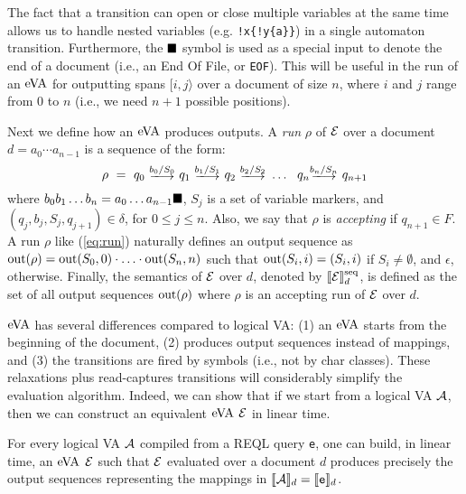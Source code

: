 The fact that a transition can open or close multiple variables at the same time
	allows us to handle nested variables (e.g. \texttt{!x\{!y\{a\}\}}) in a
	single automaton transition. Furthermore, the $\blacksquare$ symbol is used as a
	special input to denote the end of a document (i.e., an End Of File, or
	\texttt{EOF}). This will be useful in the run of an $\mathrm{eVA}$ for outputting
	spans $[i, j\rangle$ over a document of size $n$, where $i$ and $j$ range
	from $0$ to $n$ (i.e., we need $n+1$ possible positions).

Next we define how an $\mathrm{eVA}$ produces outputs. A \emph{run} $\rho$ of $\mathcal{E}$ over
a document $d = a_0 \cdots a_{n-1}$ is a sequence of the form:
\begin{equation}\label{eq:run}
	\rho \ = \ q_0 \ \longtrans{b_0 / S_0} \ q_1 \ \longtrans{b_1 / S_1} \ q_2 \ \longtrans{b_2 / S_2} \ \ldots \ \ q_{n} \longtrans{b_{n} / S_n} \ q_{n+1}
\end{equation}
where $b_0 b_1 \ldots b_n = a_0 \ldots a_{n-1} \blacksquare$, $S_j$ is a set of
variable markers, and $(q_j,b_{j},S_{j}, q_{j+1}) \in \delta$, for $0\leq j\leq
n$. Also, we say that $\rho$ is \emph{accepting} if $q_{n+1} \in F$. A run
$\rho$ like (\ref{eq:run}) naturally defines an output sequence as $\operatorname{out}(\rho)
= \operatorname{out}(S_0, 0) \cdot \ldots \cdot \operatorname{out}(S_n, n)$ such that $\operatorname{out}(S_i, i) =
(S_i, i)$ if $S_i \neq \emptyset$, and $\epsilon$, otherwise. Finally, the
semantics of $\mathcal{E}$ over $d$, denoted by $\llbracket\mathcal{E}\rrbracket^{\operatorname{seq}}_d$, is defined as the set
of all output sequences $\operatorname{out}(\rho)$ where $\rho$ is an accepting run of $\mathcal{E}$
over $d$.

$\mathrm{eVA}$ has several differences compared to logical VA: (1) an $\mathrm{eVA}$ starts from
the beginning of the document, (2) produces output sequences instead of
mappings, and (3) the transitions are fired by symbols (i.e., not by char
classes). These relaxations plus read-captures transitions will considerably
simplify the evaluation algorithm.  Indeed, we can show that if we start from a
logical VA $\mathcal{A}$, then we can construct an equivalent $\mathrm{eVA}$ $\mathcal{E}$ in linear
time. %
\begin{proposition}\label{prop:eVAconstruction}
	For every logical VA $\mathcal{A}$ compiled from a REQL query \texttt{e}, one can
	build, in linear time, an $\mathrm{eVA}$ $\mathcal{E}$ such that $\mathcal{E}$ evaluated over a
	document $d$ produces precisely the output sequences representing the
	mappings in $\llbracket\mathcal{A}\rrbracket_d = \llbracket\texttt{e}\rrbracket_d$.
\end{proposition}

